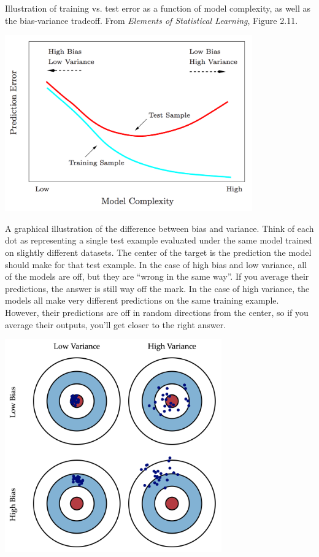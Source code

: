 Illustration of training vs. test error as a function of model complexity, as well as the bias-variance tradeoff. From \emph{Elements of Statistical Learning}, Figure 2.11.

\begin{center}
\includegraphics[width=0.8\textwidth]{img/l03-bias-variance-tradeoff.png}
\end{center}

A graphical illustration of the difference between bias and variance. Think of each dot as representing a single test example evaluated under the same model trained on slightly different datasets. The center of the target is the prediction the model should make for that test example. In the case of high bias and low variance, all of the models are off, but they are ``wrong in the same way''. If you average their predictions, the answer is still way off the mark. In the case of high variance, the models all make very different predictions on the same training example. However, their predictions are off in random directions from the center, so if you average their outputs, you'll get closer to the right answer. 

\begin{center}
\includegraphics[width=0.7\textwidth]{img/targets-bias-variance.png}
\end{center}

